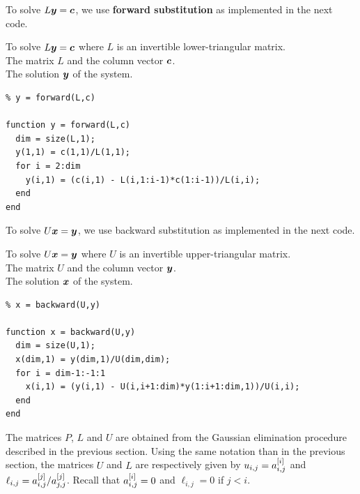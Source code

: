 To solve $L\bm{y}=\bm{c}$, we use
{\bfseries forward substitution} as
implemented in the next code.

\begin{code}
To solve $L\bm{y}=\bm{c}$ where $L$ is an invertible
lower-triangular matrix.\\
 The matrix $L$ and the column vector $\bm{c}$.\\
 The solution $\bm{y}$ of the system.
\small
\begin{verbatim}
% y = forward(L,c)

function y = forward(L,c)
  dim = size(L,1);
  y(1,1) = c(1,1)/L(1,1);
  for i = 2:dim
    y(i,1) = (c(i,1) - L(i,1:i-1)*c(1:i-1))/L(i,i);
  end
end
\end{verbatim}
\label{codeforward}
\end{code}

To solve $U\bm{x}=\bm{y}$, we use backward substitution as
implemented in the next code.

\begin{code}
To solve $U\bm{x}=\bm{y}$ where $U$ is an invertible
upper-triangular matrix.\\
 The matrix $U$ and the column vector $\bm{y}$.\\
 The solution $\bm{x}$ of the system.
\small
\begin{verbatim}
% x = backward(U,y)

function x = backward(U,y)
  dim = size(U,1);
  x(dim,1) = y(dim,1)/U(dim,dim);
  for i = dim-1:-1:1
    x(i,1) = (y(i,1) - U(i,i+1:dim)*y(1:i+1:dim,1))/U(i,i);
  end
end
\end{verbatim}
\label{codebackward}
\end{code}

The matrices $P$, $L$ and $U$ are obtained from the Gaussian
elimination procedure described in the previous section.  Using the
same notation than in the previous section, the matrices $U$ and $L$ 
are respectively given by $\displaystyle u_{i,j}= a^{[i]}_{i,j}$ and
$\displaystyle \ell_{i,j} = a^{[j]}_{i,j}/a^{[j]}_{j,j}$.  Recall that
$\displaystyle a^{[i]}_{i,j} = 0$ and $\ell_{i,j} = 0$ if $j<i$.

